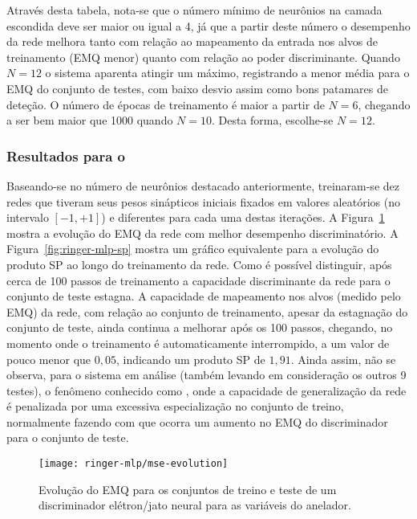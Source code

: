 Através desta tabela, nota-se que o número mínimo de neurônios na camada
escondida deve ser maior ou igual a 4, já que a partir deste número o
desempenho da rede melhora tanto com relação ao mapeamento da entrada nos
alvos de treinamento (EMQ menor) quanto com relação ao poder
discriminante. Quando $N=12$ o sistema aparenta atingir um máximo, registrando
a menor média para o EMQ do conjunto de testes, com baixo desvio assim como
bons patamares de deteção. O número de épocas de treinamento é maior a partir
de $N=6$, chegando a ser bem maior que 1000 quando $N=10$. Desta forma,
escolhe-se $N=12$.

\subsubsection{Resultados para o }

Baseando-se no número de neurônios destacado anteriormente, treinaram-se dez
redes que tiveram seus pesos sinápticos iniciais fixados em valores aleatórios
(no intervalo $[-1,+1]$) e diferentes para cada uma destas iterações. A
Figura~\ref{fig:ringer-mlp-mse} mostra a evolução do EMQ da rede com melhor
desempenho discriminatório. A Figura~\ref{fig:ringer-mlp-sp} mostra um gráfico
equivalente para a evolução do produto SP ao longo do treinamento da
rede. Como é possível distinguir, após cerca de 100 passos de treinamento a
capacidade discriminante da rede para o conjunto de teste estagna. A
capacidade de mapeamento nos alvos (medido pelo EMQ) da rede, com relação ao
conjunto de treinamento, apesar da estagnação do conjunto de teste, ainda
continua a melhorar após os 100 passos, chegando, no momento onde o treinamento
é automaticamente interrompido, a um valor de pouco menor que $0,05$,
indicando um produto SP de $1,91$. Ainda assim, não se observa, para o sistema
em análise (também levando em consideração os outros 9 testes), o fenômeno
conhecido como , onde a capacidade de generalização da rede
é penalizada por uma excessiva especialização no conjunto de treino,
normalmente fazendo com que ocorra um aumento no EMQ do discriminador para o
conjunto de teste.

\begin{figure}
\begin{center}
\texttt{[image: ringer-mlp/mse-evolution]}
\end{center}
\caption{Evolução do EMQ para os conjuntos de treino e teste de um
discriminador elétron/jato neural para as variáveis do anelador.}
\label{fig:ringer-mlp-mse}
\end{figure}


